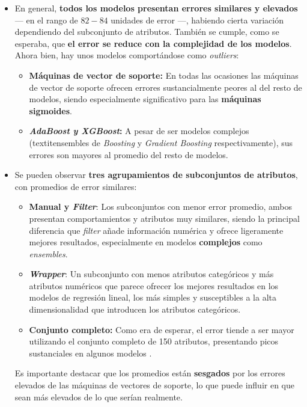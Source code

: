 \begin{itemize}[leftmargin=*, parsep=1pt, itemsep=0pt, topsep=1pt]
	\item En general, \textbf{todos los modelos presentan errores similares y elevados} --- en el rango de $82-84$ unidades de error ---, habiendo cierta variación dependiendo del subconjunto de atributos. También se cumple, como se esperaba, que \textbf{el error se reduce con la complejidad de los modelos}. Ahora bien, hay unos modelos comportándose como \textit{outliers}:
	\begin{itemize}[parsep=1pt, itemsep=0pt, topsep=1pt]
		\item \textbf{Máquinas de vector de soporte:} En todas las ocasiones las máquinas de vector de soporte ofrecen errores sustancialmente peores al del resto de modelos, siendo especialmente significativo para las \textbf{máquinas sigmoides}.
		\item \textbf{\textit{AdaBoost y XGBoost}:} A pesar de ser modelos complejos (textit{ensembles} de \textit{Boosting} y \textit{Gradient Boosting} respectivamente), sus errores son mayores al promedio del resto de modelos.
	\end{itemize}
	\item Se pueden observar \textbf{tres agrupamientos de subconjuntos de atributos}, con promedios de error similares:
	\begin{itemize}[parsep=1pt, itemsep=0pt, topsep=1pt]
		\item \textbf{Manual y \textit{Filter}}: Los subconjuntos con menor error promedio, ambos presentan comportamientos y atributos muy similares, siendo la principal diferencia que \textit{filter} añade información numérica y ofrece ligeramente mejores resultados, especialmente en modelos \textbf{complejos} como \textit{ensembles}.
		
		\item \textbf{\textit{Wrapper}}: Un subconjunto con menos atributos categóricos y más atributos numéricos que parece ofrecer los mejores resultados en los modelos de regresión lineal, los más simples y susceptibles a la alta dimensionalidad que introducen los atributos categóricos.
		
		\item \textbf{Conjunto completo:} Como era de esperar, el error tiende a ser mayor utilizando el conjunto completo de 150 atributos, presentando picos sustanciales en algunos modelos .
	\end{itemize}
	
	Es importante destacar que los promedios están \textbf{sesgados} por los errores elevados de las máquinas de vectores de soporte, lo que puede influir en que sean más elevados de lo que serían realmente.
\end{itemize}

